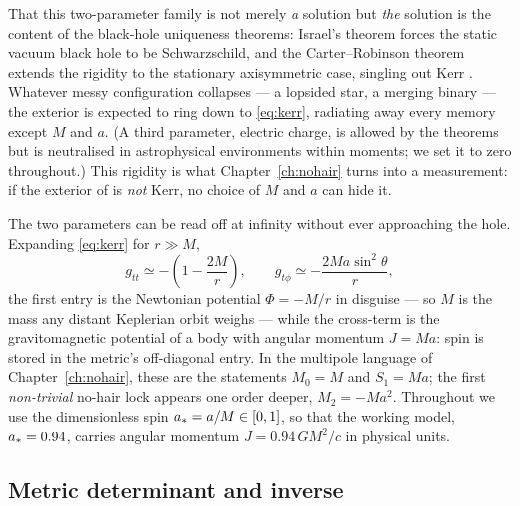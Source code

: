 That this two-parameter family is not merely \emph{a} solution but
\emph{the} solution is the content of the black-hole uniqueness
theorems: Israel's theorem forces the static vacuum black hole to be
Schwarzschild, and the Carter--Robinson theorem extends the rigidity to
the stationary axisymmetric case, singling out Kerr
\citep{Wald1984, Chandrasekhar1983}. Whatever messy configuration
collapses — a lopsided star, a merging binary — the exterior is
expected to ring down to \eqref{eq:kerr}, radiating away every memory
except $M$ and $a$. (A third parameter, electric charge, is allowed by
the theorems but is neutralised in astrophysical environments within
moments; we set it to zero throughout.) This rigidity is what
Chapter~\ref{ch:nohair} turns into a measurement: if the exterior of
\sgra{} is \emph{not} Kerr, no choice of $M$ and $a$ can hide it.

The two parameters can be read off at infinity without ever approaching
the hole. Expanding \eqref{eq:kerr} for $r \gg M$,
\begin{equation}
g_{tt} \simeq -\left(1 - \frac{2M}{r}\right), \qquad
g_{t\phi} \simeq -\frac{2Ma\sin^2\theta}{r},
\label{eq:asymptotic}
\end{equation}
the first entry is the Newtonian potential $\Phi = -M/r$ in disguise —
so $M$ is the mass any distant Keplerian orbit weighs — while the
cross-term is the gravitomagnetic potential of a body with angular
momentum $J = Ma$: spin is stored in the metric's off-diagonal entry.
In the multipole language of Chapter~\ref{ch:nohair}, these are the
statements $M_0 = M$ and $S_1 = Ma$; the first \emph{non-trivial}
no-hair lock appears one order deeper, $M_2 = -Ma^2$. Throughout we use
the dimensionless spin $a_* = a/M \in [0, 1]$, so that the working
\sgra{} model, $a_* = 0.94$, carries angular momentum
$J = 0.94\,GM^2/c$ in physical units.

\subsection{Metric determinant and inverse}

